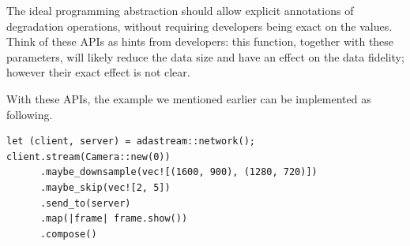 The ideal programming abstraction should allow explicit annotations of
degradation operations, without requiring developers being exact on the
values. Think of these APIs as hints from developers: this function, together
with these parameters, will likely reduce the data size and have an effect on
the data fidelity; however their exact effect is not clear.

With these APIs, the example we mentioned earlier can be implemented as
following.

\begin{lstlisting}
let (client, server) = adastream::network();
client.stream(Camera::new(0))
      .maybe_downsample(vec![(1600, 900), (1280, 720)])
      .maybe_skip(vec![2, 5])
      .send_to(server)
      .map(|frame| frame.show())
      .compose()
\end{lstlisting}

